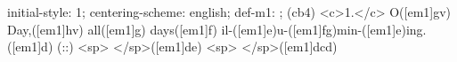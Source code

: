 initial-style: 1;
centering-scheme: english;
def-m1: \grealign;
(cb4) <c>1.</c> O([em1]gv) Day,([em1]hv) all([em1]g) days([em1]f) il-([em1]e)u-([em1]fg)min-([em1]e)ing.([em1]d) (::) <sp> </sp>([em1]de) <sp>   </sp>([em1]dcd)